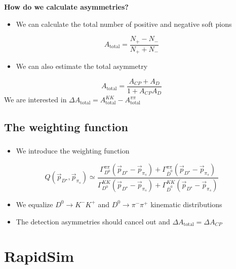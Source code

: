 \documentclass{beamer}
\begin{document}
\begin{frame}
      \frametitle{\insertsubsectionhead}
      \textbf{How do we calculate asymmetries?}

      \begin{itemize}
      \item We can calculate the total number of positive and negative soft pions
      \end{itemize}
      \begin{equation*}
            A_\text{total} = \frac{N_+ - N_-}{N_+ + N_-}
      \end{equation*}
      \begin{itemize}
            \item We can also estimate the total asymmetry
      \end{itemize}
      \begin{equation*}
            A_\text{total} = \frac{A_{CP} + A_D}{1 + A_{CP} A_D}
      \end{equation*}
      We are interested in $\Delta A_\text{total} = A_\text{total}^{KK} - A_\text{total}^{\pi\pi}$
\end{frame}
\subsection{The weighting function}
\begin{frame}
      \frametitle{\insertsubsectionhead}
      \begin{itemize}
            \item We introduce the weighting function
      \end{itemize}
      \begin{equation*}
            Q(\vec{p}_{D^\star}, \vec{p}_{\pi_s}) \simeq \frac{\Gamma_{D^0}^{\pi\pi}(\vec{p}_{D^\star} - \vec{p}_{\pi_s}) + \Gamma_{\bar{D}^0}^{\pi\pi}(\vec{p}_{D^\star} - \vec{p}_{\pi_s})}{\Gamma_{D^0}^{KK}(\vec{p}_{D^\star} - \vec{p}_{\pi_s}) + \Gamma_{\bar{D}^0}^{KK}(\vec{p}_{D^\star} - \vec{p}_{\pi_s})}
    \end{equation*}
    \begin{itemize}
      \item We equalize $D^0\to K^- K^+$ and $D^0\to \pi^- \pi^+$ kinematic distributions
      \item The detection asymmetries should cancel out and $\Delta A_\text{total} = \Delta A_{CP}$
    \end{itemize}
\end{frame}

\section{RapidSim}
\end{document}
